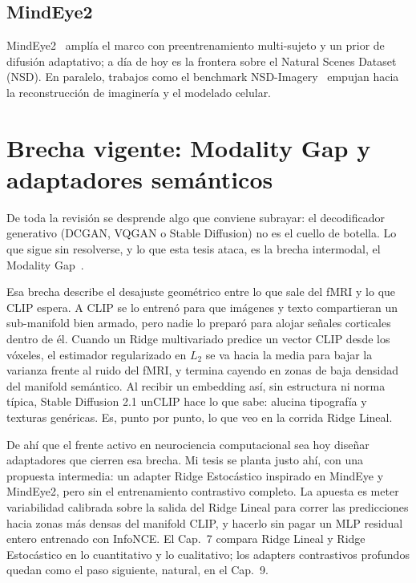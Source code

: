 \subsection{MindEye2}

MindEye2~\cite{scotti2024mindeye2} amplía el marco con preentrenamiento multi-sujeto y un
prior de difusión adaptativo; a día de hoy es la frontera sobre el Natural Scenes Dataset 
(NSD). En paralelo, trabajos como el benchmark NSD-Imagery~\cite{kneeland2025nsdimagery} 
empujan hacia la reconstrucción de imaginería y el modelado celular.

\section{Brecha vigente: Modality Gap y adaptadores semánticos}

De toda la revisión se desprende algo que conviene subrayar: el decodificador generativo 
(DCGAN, VQGAN o Stable Diffusion) no es el cuello de botella. Lo que sigue sin resolverse, y lo 
que esta tesis ataca, es la brecha intermodal, el Modality Gap~\cite{liang2022mind}.

Esa brecha describe el desajuste geométrico entre lo que sale del fMRI y lo que CLIP espera. A 
CLIP se lo entrenó para que imágenes y texto compartieran un sub-manifold bien armado, pero 
nadie lo preparó para alojar señales corticales dentro de él. Cuando un Ridge multivariado 
predice un vector CLIP desde los vóxeles, el estimador regularizado en $L_2$ se va hacia la 
media para bajar la varianza frente al ruido del fMRI, y termina cayendo en zonas de baja 
densidad del manifold semántico. Al recibir un embedding así, sin estructura ni norma típica, 
Stable Diffusion 2.1 unCLIP hace lo que sabe: alucina tipografía y texturas genéricas. Es, 
punto por punto, lo que veo en la corrida Ridge Lineal.

De ahí que el frente activo en neurociencia computacional sea hoy diseñar adaptadores que 
cierren esa brecha. Mi tesis se planta justo ahí, con una propuesta intermedia: un adapter 
Ridge Estocástico inspirado en MindEye y MindEye2, pero sin el entrenamiento contrastivo 
completo. La apuesta es meter variabilidad calibrada sobre la salida del Ridge Lineal para 
correr las predicciones hacia zonas más densas del manifold CLIP, y hacerlo sin pagar un MLP 
residual entero entrenado con InfoNCE. El Cap.~7 compara Ridge Lineal y Ridge Estocástico en 
lo cuantitativo y lo cualitativo; los adapters contrastivos profundos quedan como el paso 
siguiente, natural, en el Cap.~9.

\afterpage{\blankpage}


